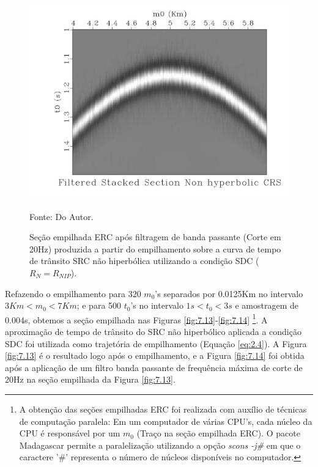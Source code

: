 \begin{figure}
\caption{Seção empilhada ERC após filtragem de banda passante (Corte em 20Hz) produzida a partir do empilhamento 
sobre a curva de tempo de trânsito SRC não hiperbólica
utilizando a condição SDC ($R_N=R_{NIP}$).}
\begin{center}
\includegraphics[scale=0.4]{images/filteredStackedSectionNcrs.jpeg}
\vspace{-0.3cm}
\end{center}
\begin{center}
 Fonte: Do Autor.
\end{center}
\label{fig:7.12}
\end{figure}

Refazendo o empilhamento para 320 $m_0$'s separados por 0.0125Km no intervalo
$3Km<m_0<7Km$; e para 500 $t_0$'s no intervalo $1s<t_0<3s$ e amostragem de 0.004s,
obtemos a seção empilhada nas Figuras \ref{fig:7.13}-\ref{fig:7.14}
\footnote{A obtenção das seções empilhadas ERC foi realizada com auxílio de técnicas de computação paralela: Em um computador
de várias CPU's, cada núcleo da CPU é responsável por um $m_0$ (Traço na seção empilhada ERC). O pacote Madagascar permite a
paralelização utilizando a opção \textit{scons -j\#} em que o caractere '\#' representa o número 
de núcleos disponíveis no computador.}.
A aproximação de tempo de trânsito do SRC não hiperbólico aplicada a condição SDC
foi utilizada como trajetória de empilhamento (Equação \ref{eq:2.4}).
A Figura \ref{fig:7.13} é o resultado logo após o empilhamento, e
a Figura \ref{fig:7.14} foi obtida após a aplicação de um filtro banda passante de frequência máxima de corte de 20Hz
na seção empilhada da Figura \ref{fig:7.13}.

